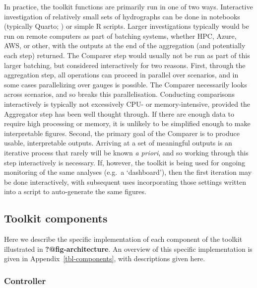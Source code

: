 \documentclass[
  number]{elsarticle}
\begin{document}
In practice, the toolkit functions are primarily run in one of two ways.
Interactive investigation of relatively small sets of hydrographs can be
done in notebooks (typically Quarto; \citep{allaire2022}) or simple R
scripts. Larger investigations typically would be run on remote
computers as part of batching systems, whether HPC, Azure, AWS, or
other, with the outputs at the end of the aggregation (and potentially
each step) returned. The Comparer step would usually not be run as part
of this larger batching, but considered interactively for two reasons.
First, through the aggregation step, all operations can proceed in
parallel over scenarios, and in some cases parallelizing over gauges is
possible. The Comparer necessarily looks across scenarios, and so breaks
this parallelisation. Conducting comparisons interactively is typically
not excessively CPU- or memory-intensive, provided the Aggregator step
has been well thought through. If there are enough data to require high
processing or memory, it is unlikely to be simplified enough to make
interpretable figures. Second, the primary goal of the Comparer is to
produce usable, interpretable outputs. Arriving at a set of meaningful
outputs is an iterative process that rarely will be known \emph{a
priori}, and so working through this step interactively is necessary.
If, however, the toolkit is being used for ongoing monitoring of the
same analyses (e.g.~a `dashboard'), then the first iteration may be done
interactively, with subsequent uses incorporating those settings written
into a script to auto-generate the same figures.

\hypertarget{toolkit-components}{%
\subsection{Toolkit components}\label{toolkit-components}}

Here we describe the specific implementation of each component of the
toolkit illustrated in \textbf{?@fig-architecture}. An overview of this
specific implementation is given in Appendix~\ref{tbl-components}, with
descriptions given here.

\hypertarget{sec-controller}{%
\subsubsection{Controller}\label{sec-controller}}
\end{document}
